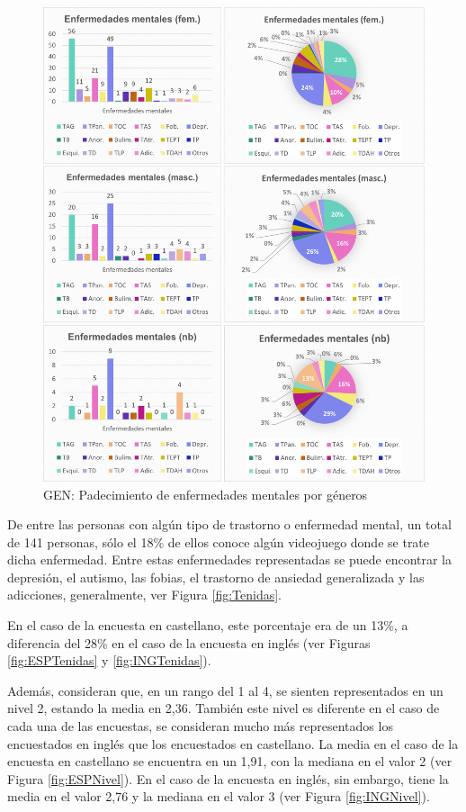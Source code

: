 \documentclass[12pt, a4paper,twoside,titlepage]{book}
\begin{document}
\begin{figure}
\centering
 \includegraphics[width=.9\linewidth]{Imagenes Form GEN/Enfermedadesgeneros} 
 \caption{GEN: Padecimiento de enfermedades mentales por géneros}
 \label{fig:Enfgeneros}
 \end{figure}
 

De entre las personas con algún tipo de trastorno o enfermedad mental, un total de 141 personas, sólo el 18\% de ellos conoce algún videojuego donde se trate dicha enfermedad. Entre estas enfermedades representadas se puede encontrar la depresión, el autismo, las fobias, el trastorno de ansiedad generalizada y las adicciones, generalmente, ver Figura \ref{fig:Tenidas}. 

En el caso de la encuesta en castellano, este porcentaje era de un 13\%, a diferencia del 28\% en el caso de la encuesta en inglés (ver Figuras  \ref{fig:ESPTenidas} y \ref{fig:INGTenidas}). 

Además, consideran que, en un rango del 1 al 4, se sienten representados en un nivel 2, estando la media en 2,36. También este nivel es diferente en el caso de cada una de las encuestas, se consideran mucho más representados los encuestados en inglés que los encuestados en castellano. La media en el caso de la encuesta en castellano se encuentra en un 1,91, con la mediana en el valor 2 (ver Figura \ref{fig:ESPNivel}). En el caso de la encuesta en inglés, sin embargo, tiene la media en el valor 2,76 y la mediana en el valor 3 (ver Figura \ref{fig:INGNivel}). 
\end{document}
